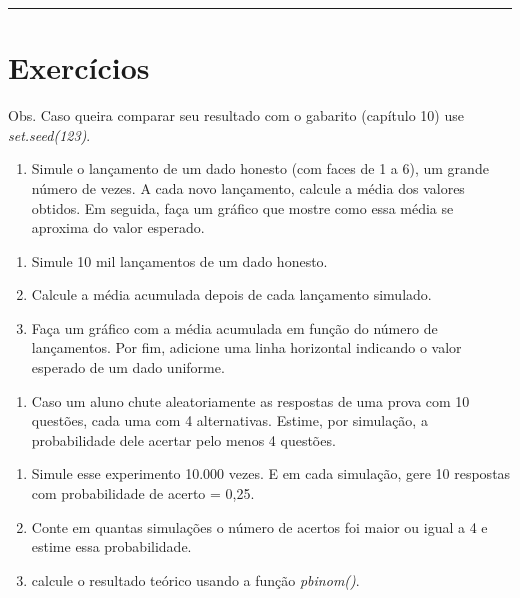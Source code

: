 \documentclass[
]{book}
\providecommand{\tightlist}{%
  \setlength{\itemsep}{0pt}\setlength{\parskip}{0pt}}
\begin{document}
\begin{center}\rule{0.5\linewidth}{0.5pt}\end{center}

\section{Exercícios}\label{exercuxedcios-6}

Obs. Caso queira comparar seu resultado com o gabarito (capítulo 10) use \emph{set.seed(123)}.

\begin{enumerate}
\def\labelenumi{\arabic{enumi}.}
\tightlist
\item
  Simule o lançamento de um dado honesto (com faces de 1 a 6), um grande número de vezes. A cada novo lançamento, calcule a média dos valores obtidos. Em seguida, faça um gráfico que mostre como essa média se aproxima do valor esperado.
\end{enumerate}

\begin{enumerate}
\def\labelenumi{(\alph{enumi})}
\tightlist
\item
  Simule 10 mil lançamentos de um dado honesto.
\item
  Calcule a média acumulada depois de cada lançamento simulado.
\item
  Faça um gráfico com a média acumulada em função do número de lançamentos. Por fim, adicione uma linha horizontal indicando o valor esperado de um dado uniforme.
\end{enumerate}

\begin{enumerate}
\def\labelenumi{\arabic{enumi}.}
\setcounter{enumi}{1}
\tightlist
\item
  Caso um aluno chute aleatoriamente as respostas de uma prova com 10 questões, cada uma com 4 alternativas. Estime, por simulação, a probabilidade dele acertar pelo menos 4 questões.
\end{enumerate}

\begin{enumerate}
\def\labelenumi{(\alph{enumi})}
\tightlist
\item
  Simule esse experimento 10.000 vezes. E em cada simulação, gere 10 respostas com probabilidade de acerto = 0,25.
\item
  Conte em quantas simulações o número de acertos foi maior ou igual a 4 e estime essa probabilidade.
\item
  calcule o resultado teórico usando a função \emph{pbinom()}.
\end{enumerate}
\end{document}

